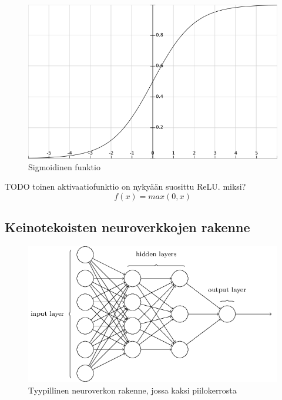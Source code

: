 \documentclass[finnish]{tktltiki2}
\theoremstyle{definition}
\theoremstyle{remark}
\begin{document}
    \begin{figure}[h]
      \centering
      \includegraphics[scale=0.6]{sigmoid}
      \caption{Sigmoidinen funktio}
      \label{pic:sigmoid}
    \end{figure}

    TODO toinen aktivaatiofunktio on nykyään suosittu ReLU. miksi?
    \begin{equation}
      f(x) = max(0, x)
      \label{eq:relu-func}
    \end{equation}



  \subsection{Keinotekoisten neuroverkkojen rakenne}

  \begin{figure}[h]
    \centering
    \includegraphics[scale=0.5]{basic-neuralnet}
    \caption{Tyypillinen neuroverkon rakenne, jossa kaksi piilokerrosta \cite{Nielsen-neural}}
    \label{pic:neuralnet}
  \end{figure}
\end{document}
